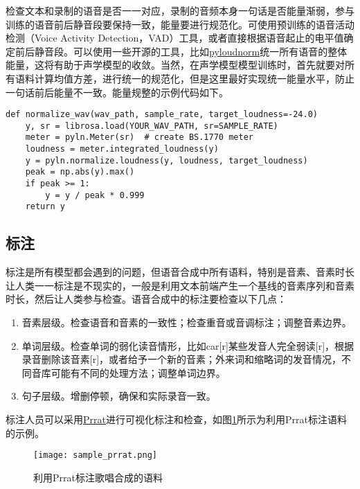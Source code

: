 \documentclass[cn,10pt,math=newtx,citestyle=gb7714-2015,bibstyle=gb7714-2015]{elegantbook}
\begin{document}
检查文本和录制的语音是否一一对应，录制的音频本身一句话是否能量渐弱，参与训练的语音前后静音段要保持一致，能量要进行规范化。可使用预训练的语音活动检测（Voice Activity Detection，VAD）工具，或者直接根据语音起止的电平值确定前后静音段。可以使用一些开源的工具，比如\href{https://github.com/csteinmetz1/pyloudnorm}{pyloudnorm}统一所有语音的整体能量，这将有助于声学模型的收敛。当然，在声学模型模型训练时，首先就要对所有语料计算均值方差，进行统一的规范化，但是这里最好实现统一能量水平，防止一句话前后能量不一致。能量规整的示例代码如下。

\begin{lstlisting}
def normalize_wav(wav_path, sample_rate, target_loudness=-24.0)
    y, sr = librosa.load(YOUR_WAV_PATH, sr=SAMPLE_RATE)
    meter = pyln.Meter(sr)  # create BS.1770 meter
    loudness = meter.integrated_loudness(y)
    y = pyln.normalize.loudness(y, loudness, target_loudness)
    peak = np.abs(y).max()
    if peak >= 1:
        y = y / peak * 0.999
    return y
\end{lstlisting}

\subsection{标注}

标注是所有模型都会遇到的问题，但语音合成中所有语料，特别是音素、音素时长让人类一一标注是不现实的，一般是利用文本前端产生一个基线的音素序列和音素时长，然后让人类参与检查。语音合成中的标注要检查以下几点：

\begin{enumerate}
  \item 音素层级。检查语音和音素的一致性；检查重音或音调标注；调整音素边界。
  \item 单词层级。检查单词的弱化读音情形，比如car[r]某些发音人完全弱读[r]，根据录音删除该音素[r]，或者给予一个新的音素；外来词和缩略词的发音情况，不同音库可能有不同的处理方法；调整单词边界。
  \item 句子层级。增删停顿，确保和实际录音一致。
\end{enumerate}

标注人员可以采用\href{https://www.fon.hum.uva.nl/praat/}{Prrat}进行可视化标注和检查，如图\ref{fig:sample_prrat}所示为利用Prrat标注语料的示例。

\begin{figure}[htbp]
  \centering
  \texttt{[image: sample\_prrat.png]}
  \caption{利用Prrat标注歌唱合成的语料 \label{fig:sample_prrat}}
\end{figure}
\end{document}
